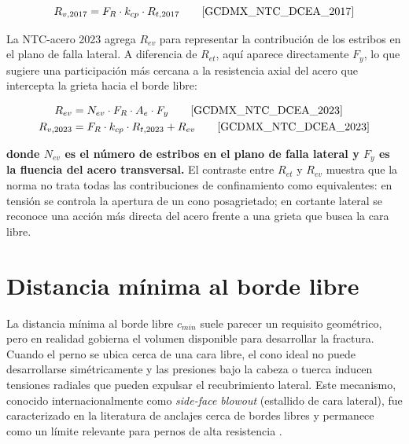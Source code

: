 \begin{equation}
  R_{v,2017} = F_R\cdot k_{cp}\cdot R_{t,2017}
  \qquad \text{\cite{GCDMX_NTC_DCEA_2017}}
  \label{eq:Rv2017}
\end{equation}

La NTC-acero 2023 agrega $R_{ev}$ para representar la contribución de los estribos en el plano de falla lateral. A diferencia de $R_{et}$, aquí aparece directamente $F_y$, lo que sugiere una participación más cercana a la resistencia axial del acero que intercepta la grieta hacia el borde libre:

\begin{align}
  R_{ev} &= N_{ev}\cdot F_R\cdot A_e\cdot F_y
  \qquad \text{\cite{GCDMX_NTC_DCEA_2023}}
  \label{eq:Rev}\\
  R_{v,2023} &= F_R\cdot k_{cp}\cdot R_{t,2023} + R_{ev}
  \qquad \text{\cite{GCDMX_NTC_DCEA_2023}}
  \label{eq:Rv2023}
\end{align}

\noindent\textbf{donde $N_{ev}$ es el número de estribos en el plano de falla lateral y $F_y$ es la fluencia del acero transversal.} El contraste entre $R_{et}$ y $R_{ev}$ muestra que la norma no trata todas las contribuciones de confinamiento como equivalentes: en tensión se controla la apertura de un cono posagrietado; en cortante lateral se reconoce una acción más directa del acero frente a una grieta que busca la cara libre.

\endgroup

\section{Distancia mínima al borde libre}

La distancia mínima al borde libre $c_{min}$ suele parecer un requisito geométrico, pero en realidad gobierna el volumen disponible para desarrollar la fractura. Cuando el perno se ubica cerca de una cara libre, el cono ideal no puede desarrollarse simétricamente y las presiones bajo la cabeza o tuerca inducen tensiones radiales que pueden expulsar el recubrimiento lateral. Este mecanismo, conocido internacionalmente como \textit{side-face blowout} (estallido de cara lateral), fue caracterizado en la literatura de anclajes cerca de bordes libres y permanece como un límite relevante para pernos de alta resistencia \cite{FurcheEligehausen_1991, ACI318_2019, Williams_2025_ACIAnchoring}.

